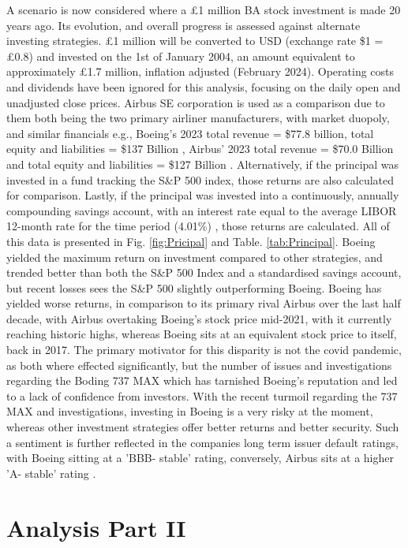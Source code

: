 \documentclass[
	a4paper, %
	11pt, %
	twoside, %
]{LTJournalArticle}
\begin{document}
\noindent A scenario is now considered where a £1 million BA stock investment is made 20 years ago.
Its evolution, and overall progress is assessed against alternate investing strategies.
£1 million will be converted to USD (exchange rate \$1 = £0.8) and invested on the 1st of January 2004, an amount equivalent to approximately £1.7 million, inflation adjusted (February 2024).
Operating costs and dividends have been ignored for this analysis, focusing on the daily open and unadjusted close prices.
Airbus SE corporation is used as a comparison due to them both being the two primary airliner manufacturers, with market duopoly, and similar financials e.g., Boeing's 2023 total revenue = \$77.8 billion, total equity and liabilities = \$137 Billion \cite{Boeing_finance_report}, Airbus' 2023 total revenue = \$70.0 Billion and total equity and liabilities = \$127 Billion \cite{Airbus_report}. 
Alternatively, if the principal was invested in a fund tracking the S\&P 500 index, those returns are also calculated for comparison.
Lastly, if the principal was invested into a continuously, annually compounding savings account, with an interest rate equal to the average LIBOR 12-month rate for the time period (4.01\%) \cite{LIBOR_RATES}, those returns are calculated.
All of this data is presented in Fig. \ref{fig:Pricipal} and Table. \ref{tab:Principal}.
Boeing yielded the maximum return on investment compared to other strategies, and trended better than both the S\&P 500 Index and a standardised savings account, but recent losses sees the S\&P 500 slightly outperforming Boeing. 
Boeing has yielded worse returns, in comparison to its primary rival Airbus over the last half decade, with Airbus overtaking Boeing's stock price mid-2021, with it currently reaching historic highs, whereas Boeing sits at an equivalent stock price to itself, back in 2017.
The primary motivator for this disparity is not the covid pandemic, as both where effected significantly, but the number of issues and investigations regarding the Boding 737 MAX which has tarnished Boeing's reputation and led to a lack of confidence from investors.
With the recent turmoil regarding the 737 MAX and investigations, investing in Boeing is a very risky at the moment, whereas other investment strategies offer better returns and better security.
Such a sentiment is further reflected in the companies long term issuer default ratings, with Boeing sitting at a 'BBB- stable' rating, conversely, Airbus sits at a higher 'A- stable' rating \cite{credi_ratings}.

\section{Analysis Part II}
\label{sec:two}
\end{document}
